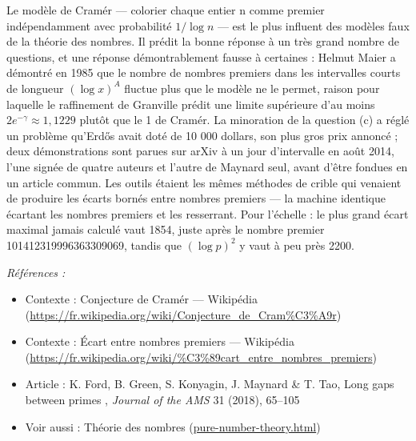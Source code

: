 \documentclass[11pt]{article}
\newenvironment{refs}{\par\small\noindent\emph{Références :}\begin{itemize}\setlength\itemsep{0pt}}{\end{itemize}\normalsize}
\begin{document}
\noindent Le modèle de Cramér --- colorier chaque entier n comme premier
indépendamment avec probabilité $ 1/\log n $ --- est le plus influent des modèles faux de
la théorie des nombres. Il prédit la bonne réponse à un très grand nombre de questions, et
une réponse démontrablement fausse à certaines : Helmut Maier a démontré en 1985 que le
nombre de nombres premiers dans les intervalles courts de longueur $ (\log x)^A $ fluctue
plus que le modèle ne le permet, raison pour laquelle le raffinement de Granville prédit une
limite supérieure d'au moins $ 2e^{-\gamma} \approx 1{,}1229 $ plutôt que le 1 de Cramér.
La minoration de la question (c) a réglé un problème qu'Erd\H{o}s avait doté de 10 000 dollars,
son plus gros prix annoncé ; deux démonstrations sont parues sur arXiv à un jour
d'intervalle en août 2014, l'une signée de quatre auteurs et l'autre de Maynard seul, avant
d'être fondues en un article commun. Les outils étaient les mêmes méthodes de crible qui
venaient de produire les écarts bornés entre nombres premiers --- la machine identique
écartant les nombres premiers et les resserrant. Pour l'échelle : le plus grand écart
maximal jamais calculé vaut 1854, juste après le nombre premier 101412319996363309069,
tandis que $ (\log p)^2 $ y vaut à peu près 2200.

\begin{refs}
\item Contexte : Conjecture de Cramér --- Wikipédia (\url{https://fr.wikipedia.org/wiki/Conjecture_de_Cram%C3%A9r})
\item Contexte : Écart entre nombres premiers --- Wikipédia (\url{https://fr.wikipedia.org/wiki/%C3%89cart_entre_nombres_premiers})
\item Article : K. Ford, B. Green, S. Konyagin, J. Maynard \& T. Tao, \og{} Long gaps between primes \fg{}, \textit{Journal of the AMS} 31 (2018), 65--105
\item Voir aussi : Théorie des nombres (\url{pure-number-theory.html})
\end{refs}

\bigskip
\end{document}
